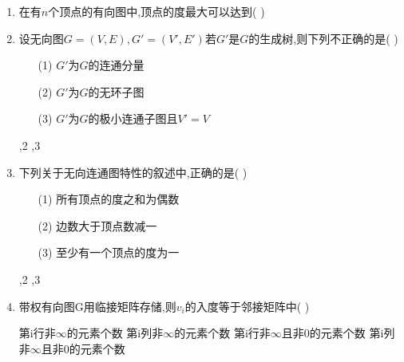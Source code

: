 \documentclass[12pt, a4paper, oneside, UTF8]{ctexbook}
\begin{document}
\begin{enumerate}
    \item 在有$n$个顶点的有向图中,顶点的度最大可以达到(    ) 
    

    \item 设无向图$G=(V,E),G'=(V',E')$若$G'$是$G$的生成树,则下列不正确的是(   ) 
    \begin{enumerate}
        \item [(1)] $G'$为$G$的连通分量 
        \item [(2)] $G'$为$G$的无环子图
        \item [(3)] $G'$为$G$的极小连通子图且$V'=V$   
    \end{enumerate}
    \begin{choices}
        ,2  ,3 
    \end{choices}

    \item \bl 下列关于无向连通图特性的叙述中,正确的是(  ) 
    \begin{enumerate}
        \item [(1)] 所有顶点的度之和为偶数 
        \item [(2)] 边数大于顶点数减一 
        \item [(3)] 至少有一个顶点的度为一 
    \end{enumerate}
    \begin{choices}
          ,2 ,3 
    \end{choices}


    \item 带权有向图G用临接矩阵存储,则$v_i$的入度等于邻接矩阵中(    )
    \begin{choices}[2]
        \task 第i行非$\infty$的元素个数
        \task 第i列非$\infty$的元素个数
        \task 第i行非$\infty$且非0的元素个数
        \task 第i列非$\infty$且非0的元素个数
    \end{choices}


\end{enumerate}
\end{document}
